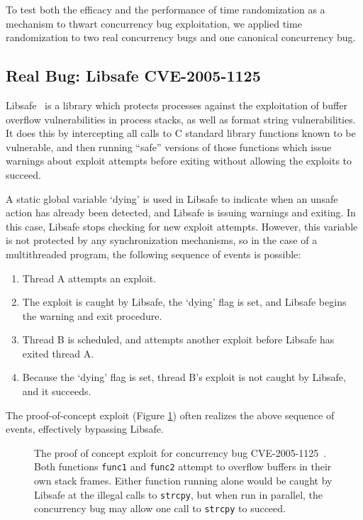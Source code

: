 To test both the efficacy and the performance of time randomization as a mechanism to thwart concurrency bug exploitation, we applied time randomization to two real concurrency bugs and one canonical concurrency bug.
\subsection{Real Bug: Libsafe CVE-2005-1125}
Libsafe~\cite{Tsai2001} is a library which protects processes against the
exploitation of buffer overflow vulnerabilities in process stacks, as well as
format string vulnerabilities.  It does this by intercepting all calls to C
standard library functions known to be vulnerable, and then running ``safe'' versions of those functions which issue warnings about exploit attempts before exiting without allowing the exploits to succeed.

A static global variable `dying' is used in Libsafe to indicate when an unsafe action has already been detected, and Libsafe is issuing warnings and exiting.  In this case, Libsafe stops checking for new exploit attempts.  However, this variable is not protected by any synchronization mechanisms, so in the case of a multithreaded program, the following sequence of events is possible:
\begin{enumerate}
	\item Thread A attempts an exploit.
	\item The exploit is caught by Libsafe, the `dying' flag is set, and Libsafe begins the warning and exit procedure.
	\item Thread B is scheduled, and attempts another exploit before Libsafe has exited thread A.
	\item Because the `dying' flag is set, thread B's exploit is not caught by Libsafe, and it succeeds.
\end{enumerate}
The proof-of-concept exploit (Figure \ref{fig_poc})\cite{Bugtraq13190} often realizes the above sequence of events, effectively bypassing Libsafe.
\begin{figure}
	
	\caption{The proof of concept exploit for concurrency bug CVE-2005-1125~\cite{CVE-2005-1125}.  Both functions \texttt{func1} and \texttt{func2} attempt to overflow buffers in their own stack frames.  Either function running alone would be caught by Libsafe at the illegal calls to \texttt{strcpy}, but when run in parallel, the concurrency bug may allow one call to \texttt{strcpy} to succeed.}
	\label{fig_poc}
\end{figure}

